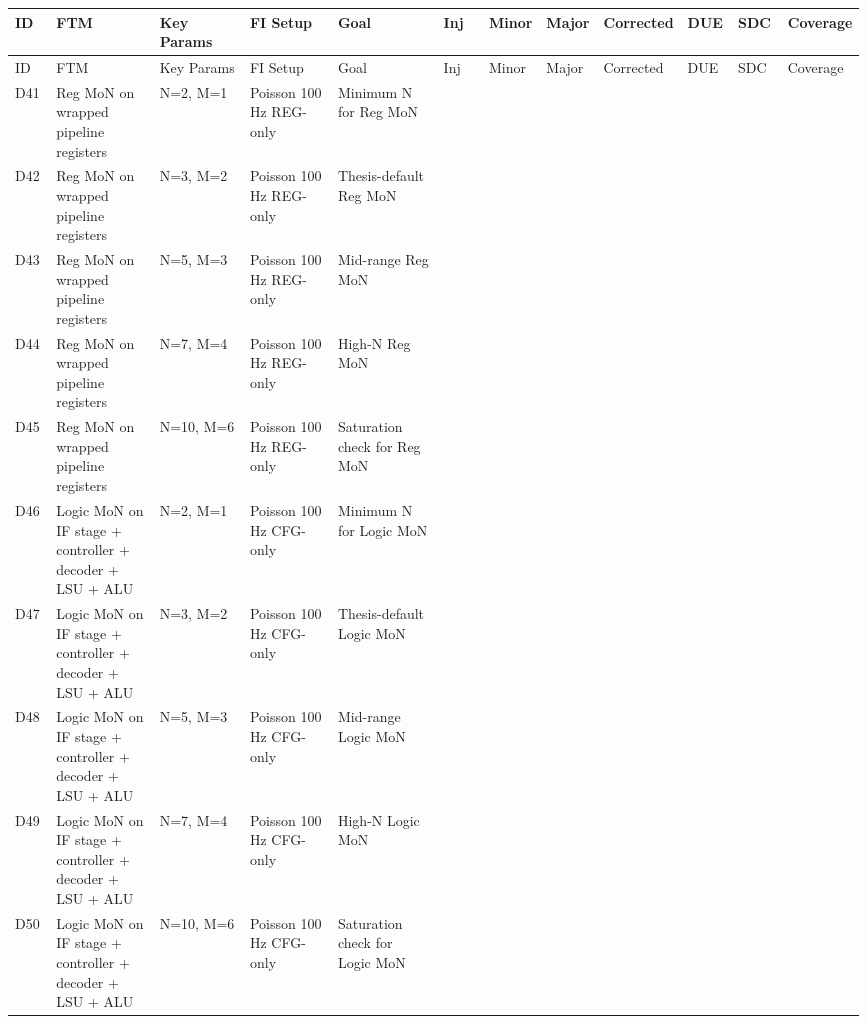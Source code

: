 \begin{longtable}{|p{0.05\linewidth}|p{0.14\linewidth}|p{0.12\linewidth}|p{0.12\linewidth}|p{0.14\linewidth}|p{0.06\linewidth}|p{0.06\linewidth}|p{0.06\linewidth}|p{0.06\linewidth}|p{0.06\linewidth}|p{0.06\linewidth}|p{0.06\linewidth}|}
\hline
ID & FTM & Key Params & FI Setup & Goal & Inj & Minor & Major & Corrected & DUE & SDC & Coverage \\
\hline
\endfirsthead
\hline
ID & FTM & Key Params & FI Setup & Goal & Inj & Minor & Major & Corrected & DUE & SDC & Coverage \\
\hline
\endhead
D41 & Reg MoN on wrapped pipeline registers & N=2, M=1 & Poisson 100 Hz \textbar{} REG-only & Minimum N for Reg MoN &  &  &  &  &  &  &  \\
\hline
D42 & Reg MoN on wrapped pipeline registers & N=3, M=2 & Poisson 100 Hz \textbar{} REG-only & Thesis-default Reg MoN &  &  &  &  &  &  &  \\
\hline
D43 & Reg MoN on wrapped pipeline registers & N=5, M=3 & Poisson 100 Hz \textbar{} REG-only & Mid-range Reg MoN &  &  &  &  &  &  &  \\
\hline
D44 & Reg MoN on wrapped pipeline registers & N=7, M=4 & Poisson 100 Hz \textbar{} REG-only & High-N Reg MoN &  &  &  &  &  &  &  \\
\hline
D45 & Reg MoN on wrapped pipeline registers & N=10, M=6 & Poisson 100 Hz \textbar{} REG-only & Saturation check for Reg MoN &  &  &  &  &  &  &  \\
\hline
D46 & Logic MoN on IF stage + controller + decoder + LSU + ALU & N=2, M=1 & Poisson 100 Hz \textbar{} CFG-only & Minimum N for Logic MoN &  &  &  &  &  &  &  \\
\hline
D47 & Logic MoN on IF stage + controller + decoder + LSU + ALU & N=3, M=2 & Poisson 100 Hz \textbar{} CFG-only & Thesis-default Logic MoN &  &  &  &  &  &  &  \\
\hline
D48 & Logic MoN on IF stage + controller + decoder + LSU + ALU & N=5, M=3 & Poisson 100 Hz \textbar{} CFG-only & Mid-range Logic MoN &  &  &  &  &  &  &  \\
\hline
D49 & Logic MoN on IF stage + controller + decoder + LSU + ALU & N=7, M=4 & Poisson 100 Hz \textbar{} CFG-only & High-N Logic MoN &  &  &  &  &  &  &  \\
\hline
D50 & Logic MoN on IF stage + controller + decoder + LSU + ALU & N=10, M=6 & Poisson 100 Hz \textbar{} CFG-only & Saturation check for Logic MoN &  &  &  &  &  &  &  \\
\hline
\end{longtable}

